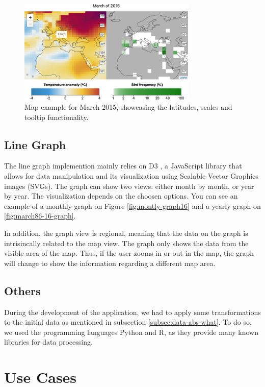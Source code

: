 \documentclass[journal]{vgtc}                %
\begin{document}
\begin{figure}[h]
  \centering
  \includegraphics[width=85mm]{map-example}
  \caption{Map example for March 2015, showcasing the latitudes, scales and tooltip functionality.}
  \label{fig:map-example}
\end{figure}

\subsection{Line Graph}

The line graph implemention mainly relies on D3 \cite{d3js}, a JavaScript library that allows for data manipulation and its visualization using Scalable Vector Graphics images (SVGs). The graph can show two views: either month by month, or year by year. The visualization depends on the choosen options. You can see an example of a monthly graph on Figure \ref{fig:montly-graph16} and a yearly graph on \ref{fig:march86-16-graph}.

In addition, the graph view is regional, meaning that the data on the graph is intrisincally related to the map view. The graph only shows the data from the visible area of the map. Thus, if the user zooms in or out in the map, the graph will change to show the information regarding a different map area.

\subsection{Others}

During the development of the application, we had to apply some transformations to the initial data as mentioned in subsection \ref{subsec:data-abs-what}. To do so, we used the programming languages Python and R, as they provide many known libraries for data processing.

\section{Use Cases}
\end{document}
